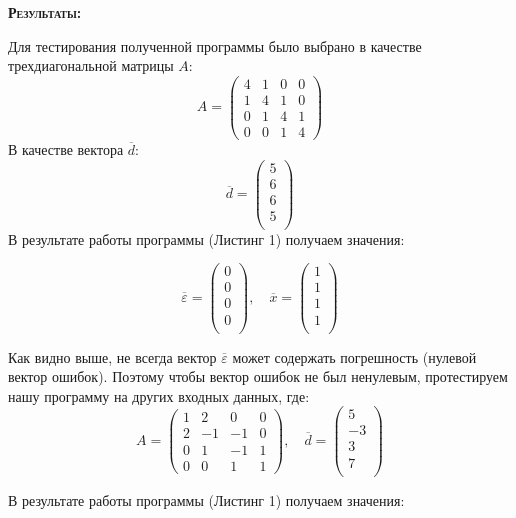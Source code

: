\documentclass [12pt]{article}
\begin{document}
\textsc{\textbf{Результаты:}}

Для тестирования полученной программы было выбрано в качестве трехдиагональной матрицы $A$: 
$$A = \left(\begin{array}{cccc} 
4 & 1 & 0 & 0 \\
1 & 4 & 1 & 0 \\
0 & 1 & 4 & 1 \\
0 & 0 & 1 & 4  
\end{array}\right) $$
В качестве вектора $\overline{d}$: 
$$\overline{d} = \left(\begin{array}{c} 
5 \\
6 \\
6 \\
5 \\
\end{array}\right)$$
В результате работы программы (Листинг 1) получаем значения:

$$\overline{\varepsilon} = \left(\begin{array}{c} 
0 \\
0 \\
0 \\
0 \\
\end{array}\right), \quad \overline{x} = \left(\begin{array}{c} 
1 \\
1 \\
1 \\
1 \\
\end{array}\right)$$

Как видно выше, не всегда вектор $\overline{\varepsilon}$ может содержать погрешность (нулевой вектор ошибок). Поэтому чтобы вектор ошибок не был ненулевым, протестируем нашу программу на других входных данных, где: 
$$ A = 
\left(\begin{array}{cccc} 
1 & 2 & 0 & 0 \\
2 & -1 & -1 & 0 \\
0 & 1 & -1 & 1 \\
0 & 0 & 1 & 1  
\end{array}\right), \quad \overline{d}
 =
 \left(\begin{array}{c} 
5 \\
-3 \\
3 \\
7 \\
\end{array}\right)
$$

В результате работы программы (Листинг 1) получаем значения:
\end{document}
